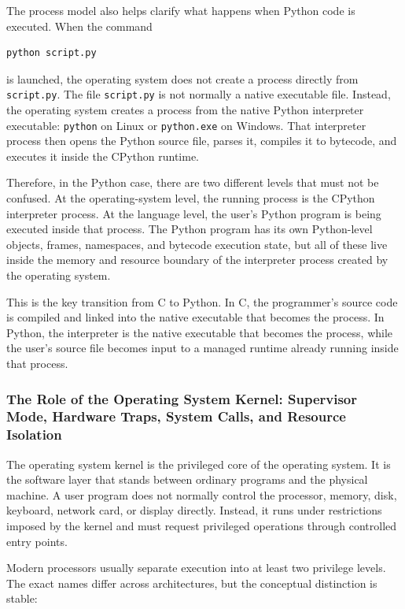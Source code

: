 \documentclass[a4paper,twoside]{report}
\begin{document}
The process model also helps clarify what happens when Python code is executed. When the command

\begin{verbatim}
python script.py
\end{verbatim}

is launched, the operating system does not create a process directly from \texttt{script.py}. The file \texttt{script.py} is not normally a native executable file. Instead, the operating system creates a process from the native Python interpreter executable: \texttt{python} on Linux or \texttt{python.exe} on Windows. That interpreter process then opens the Python source file, parses it, compiles it to bytecode, and executes it inside the CPython runtime.

Therefore, in the Python case, there are two different levels that must not be confused. At the operating-system level, the running process is the CPython interpreter process. At the language level, the user's Python program is being executed inside that process. The Python program has its own Python-level objects, frames, namespaces, and bytecode execution state, but all of these live inside the memory and resource boundary of the interpreter process created by the operating system.

This is the key transition from C to Python. In C, the programmer's source code is compiled and linked into the native executable that becomes the process. In Python, the interpreter is the native executable that becomes the process, while the user's source file becomes input to a managed runtime already running inside that process.

\subsubsection{The Role of the Operating System Kernel: Supervisor Mode, Hardware Traps, System Calls, and Resource Isolation}

The operating system kernel is the privileged core of the operating system. It is the software layer that stands between ordinary programs and the physical machine. A user program does not normally control the processor, memory, disk, keyboard, network card, or display directly. Instead, it runs under restrictions imposed by the kernel and must request privileged operations through controlled entry points.

Modern processors usually separate execution into at least two privilege levels. The exact names differ across architectures, but the conceptual distinction is stable:
\end{document}
